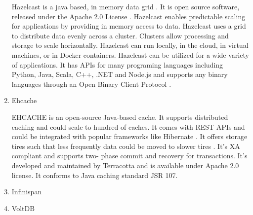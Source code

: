 \begin{enumerate}
Hazelcast is a java based, in memory data grid
\label{\detokenize{i524/technologies:id343}}{\hyperref[\detokenize{i524/technologies:www-wikihazel}]{\sphinxcrossref{{[}294{]}}}}.  It is open source software, released
under the Apache 2.0 License \label{\detokenize{i524/technologies:id344}}{\hyperref[\detokenize{i524/technologies:www-githubhazel}]{\sphinxcrossref{{[}295{]}}}}. Hazelcast
enables predictable scaling for applications by providing in
memory access to data.  Hazelcast uses a grid to distribute data
evenly across a cluster. Clusters allow processing and storage to
scale horizontally. Hazelcast can run locally, in the cloud, in
virtual machines, or in Docker containers. Hazelcast can be
utilized for a wide variety of applications. It has APIs for many
programing languages including Python, Java, Scala, C++, .NET and
Node.js and supports any binary languages through an Open Binary
Client Protocol \label{\detokenize{i524/technologies:id345}}{\hyperref[\detokenize{i524/technologies:www-wikihazel}]{\sphinxcrossref{{[}294{]}}}}.

\item {} 
Ehcache

EHCACHE is an open-source Java-based cache. It supports
distributed caching and could scale to hundred of caches. It
comes with REST APIs and could be integrated with popular
frameworks like Hibernate \label{\detokenize{i524/technologies:id346}}{\hyperref[\detokenize{i524/technologies:www-ehcache-features}]{\sphinxcrossref{{[}296{]}}}}. It offers
storage tires such that less frequently data could be moved to
slower tires \label{\detokenize{i524/technologies:id347}}{\hyperref[\detokenize{i524/technologies:www-ehcache-documentation}]{\sphinxcrossref{{[}297{]}}}}. It's XA compliant
and supports two- phase commit and recovery for
transactions. It's developed and maintained by Terracotta and is
available under Apache 2.0 license.  It conforms to Java caching
standard JSR 107.

\item {} 
Infinispan

\item {} 
VoltDB


\end{enumerate}
